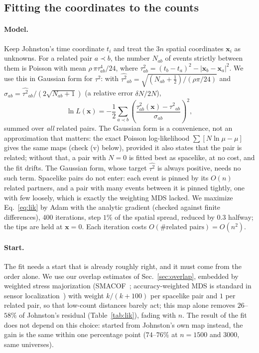 \documentclass[11pt,a4paper]{article}
\begin{document}
\subsection{Fitting the coordinates to the counts}\label{sec:likelihood}
\paragraph{Model.} Keep Johnston's time coordinate $t_i$ and treat the $3n$ spatial coordinates $\mathbf x_i$ as unknowns. For a related pair $a\prec b$, the number $N_{ab}$ of events strictly between them is Poisson with mean $\rho\,\pi\tau_{ab}^4/24$, where $\tau_{ab}^2=(t_b-t_a)^2-|\mathbf x_b-\mathbf x_a|^2$. We use this in Gaussian form for $\tau^2$: with $\widehat{\tau^2}_{ab}=\sqrt{(N_{ab}+\tfrac12)/(\rho\pi/24)}$ and $\sigma_{ab}=\widehat{\tau^2}_{ab}/(2\sqrt{N_{ab}+1})$ (a relative error $\delta N/2N$),
\begin{equation}
\ln L(\mathbf x)=-\frac12\sum_{a\prec b}\left(\frac{\tau^2_{ab}(\mathbf x)-\widehat{\tau^2}_{ab}}{\sigma_{ab}}\right)^{\!2},
\label{eq:lik}
\end{equation}
summed over \emph{all} related pairs. The Gaussian form is a convenience, not an approximation that matters: the exact Poisson log-likelihood $\sum[N\ln\mu-\mu]$ gives the same maps (check (v) below), provided it also states that the pair is related; without that, a pair with $N=0$ is fitted best as spacelike, at no cost, and the fit drifts. The Gaussian form, whose target $\widehat{\tau^2}$ is always positive, needs no such term. Spacelike pairs do not enter: each event is pinned by its $O(n)$ related partners, and a pair with many events between it is pinned tightly, one with few loosely, which is exactly the weighting MDS lacked. We maximize Eq.~\eqref{eq:lik} by Adam with the analytic gradient (checked against finite differences), 400 iterations, step $1\%$ of the spatial spread, reduced by $0.3$ halfway; the tips are held at $\mathbf x=0$. Each iteration costs $O(\#\text{related pairs})=O(n^2)$.

\paragraph{Start.} The fit needs a start that is already roughly right, and it must come from the order alone. We use our overlap estimates of Sec.~\ref{sec:overlap}, embedded by weighted stress majorization (SMACOF~\cite{deLeeuwMair09}; accuracy-weighted MDS is standard in sensor localization~\cite{CostaPatwariHero06}) with weight $k/(k+100)$ per spacelike pair and $1$ per related pair, so that low-count distances barely act; this map alone removes $26$--$58\%$ of Johnston's residual (Table~\ref{tab:lik}), fading with $n$. The result of the fit does not depend on this choice: started from Johnston's own map instead, the gain is the same within one percentage point ($74$--$76\%$ at $n=1500$ and $3000$, same universes).
\end{document}
